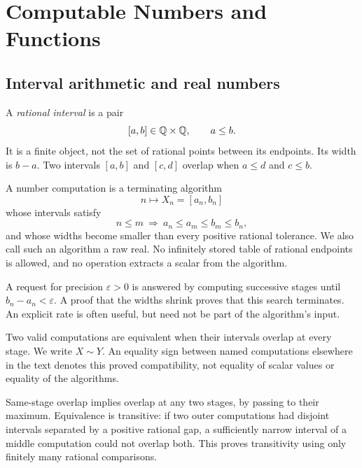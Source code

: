 \chapter{Computable Numbers and Functions}\label{ch:foundations}

\section{Interval arithmetic and real numbers}

\begin{definition}\label{def:qinterval}
A \emph{rational interval} is a pair
\[
 [a,b]\in\mathbb{Q}\times\mathbb{Q},\qquad a\le b.
\]
It is a finite object, not the set of rational points between its endpoints.
Its width is $b-a$.  Two intervals $[a,b]$ and $[c,d]$ overlap when
$a\le d$ and $c\le b$.
\end{definition}

\begin{definition}\label{def:raw-real}
A number computation is a terminating algorithm
\[
 n\longmapsto X_n=[a_n,b_n]
\]
whose intervals satisfy
\[
 n\le m\ \Longrightarrow\ a_n\le a_m\le b_m\le b_n,
\]
and whose widths become smaller than every positive rational tolerance.
We also call such an algorithm a raw real.  No infinitely stored table of
rational endpoints is allowed, and no operation extracts a scalar from
the algorithm.
\end{definition}

A request for precision $\varepsilon>0$ is answered by computing successive
stages until $b_n-a_n<\varepsilon$.  A proof that the widths shrink proves
that this search terminates.  An explicit rate is often useful, but need not
be part of the algorithm's input.

\begin{definition}[Equivalence]\label{def:raw-equiv}
Two valid computations are equivalent when their intervals overlap at every
stage.  We write $X\sim Y$.  An equality sign between named computations
elsewhere in the text denotes this proved compatibility, not equality of
scalar values or equality of the algorithms.
\end{definition}

Same-stage overlap implies overlap at any two stages, by passing to their
maximum.  Equivalence is transitive: if two outer computations had disjoint
intervals separated by a positive rational gap, a sufficiently narrow interval
of a middle computation could not overlap both.  This proves transitivity
using only finitely many rational comparisons.

